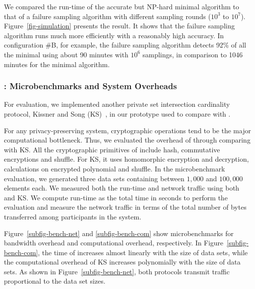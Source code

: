 We compared the run-time of the accurate but NP-hard minimal \rg algorithm
to that of a failure sampling algorithm with different sampling rounds ($10^3$ to $10^7$).
Figure~\ref{fig-simulation} presents the result.
It shows that the failure sampling algorithm
runs much more efficiently with a reasonably high accuracy.
In configuration \#B, for example, the failure sampling algorithm
detects 92\% of all the minimal \rgs using about 90 minutes with $10^6$ samplings,
in comparison to 1046 minutes for the minimal \rg algorithm.




\subsubsection{\small{\pia: Microbenchmarks and System Overheads}}
\label{subsubsec-micro}


For \pia evaluation,
we implemented another private set intersection 
cardinality protocol, Kissner and Song (KS)~\cite{kissner05privacy},
in our prototype used to compare with \pso.


For any privacy-preserving system, 
cryptographic operations tend to be 
the major computational bottleneck.
Thus, we evaluated the overhead of \pia 
through comparing \pso with KS.
All the cryptographic primitives of \pso
include hash, commutative encryptions and shuffle.
For KS, it uses homomorphic encryption and decryption, 
calculations on encrypted polynomial and shuffle.
In the microbenchmark evaluation,
we generated three data sets 
containing between $1,000$ and $100,000$ elements each.
We measured both the run-time and network traffic
using both \pso and KS.
We compute run-time as the total time in seconds to perform the evaluation
and measure the network traffic in terms of the total number of bytes
transferred among participants in the system.


Figure~\ref{subfig-bench-net} and \ref{subfig-bench-com} show
microbenchmarks for bandwidth overhead 
and computational overhead, respectively.
In Figure~\ref{subfig-bench-com},
the time of \pso increases almost linearly with the
size of data sets, while the computational overhead of
KS increases polynomially with the size of data sets.
As shown in Figure~\ref{subfig-bench-net},
both protocols transmit traffic proportional
to the data set sizes.


